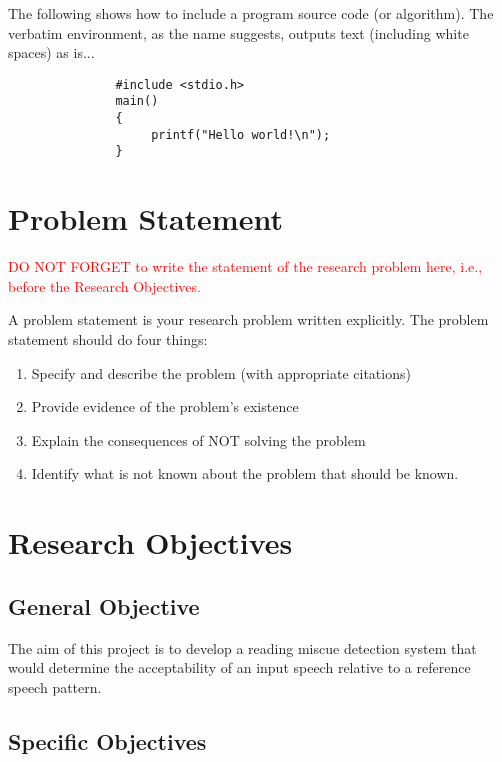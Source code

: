 The following shows how to include a program source code (or algorithm).  
The verbatim environment, as the name suggests, outputs text (including white spaces) as is...

\begin{verbatim}
               #include <stdio.h>
               main()
               {
                    printf("Hello world!\n");
               }
\end{verbatim}

\section{Problem Statement}
\textcolor{red}{DO NOT FORGET to write the statement of the research problem here, i.e., before the Research Objectives.}

A problem statement is your research problem written explicitly.  
The problem statement should do four things: 
\begin{enumerate}
	\item Specify and describe the problem (with appropriate citations) 
	\item  Provide evidence of the problem’s existence  
	\item Explain the consequences of NOT solving the problem  
	\item 	Identify what is not known about the problem that should be known.
\end{enumerate}


\section{Research Objectives}
\label{sec:researchobjectives}

\subsection{General Objective}
\label{sec:generalobjective}

The aim of this project is to develop a reading miscue detection system that would determine the acceptability of an input speech relative to a reference speech pattern.

\subsection{Specific Objectives}
\label{sec:specificobjectives}

%
%

